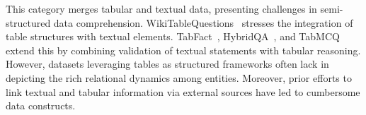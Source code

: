 This category merges tabular and textual data, presenting challenges in semi-structured data comprehension. WikiTableQuestions~\cite{pasupat-liang-2015-compositional} stresses the integration of table structures with textual elements. TabFact~\cite{Chen2020TabFact:}, HybridQA~\cite{chen-etal-2020-hybridqa}, and TabMCQ~\cite{journals/corr/JauharTH16} extend this by combining validation of textual statements with tabular reasoning. However, datasets leveraging tables as structured frameworks often lack in depicting the rich relational dynamics among entities. Moreover, prior efforts to link textual and tabular information via external sources have led to cumbersome data constructs. 

 

